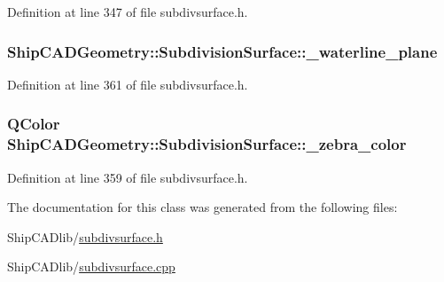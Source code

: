Definition at line 347 of file subdivsurface.\-h.

\hypertarget{classShipCADGeometry_1_1SubdivisionSurface_aaa7e9b322884649fb506848a9b4e2994}{
\subsubsection[{\-\_\-waterline\-\_\-plane}]{ Ship\-C\-A\-D\-Geometry\-::\-Subdivision\-Surface\-::\-\_\-waterline\-\_\-plane\hspace{0.3cm}{\ttfamily [protected]}}}\label{classShipCADGeometry_1_1SubdivisionSurface_aaa7e9b322884649fb506848a9b4e2994}


Definition at line 361 of file subdivsurface.\-h.

\hypertarget{classShipCADGeometry_1_1SubdivisionSurface_a26726d15987c2985f5ba16fba5c470b7}{
\subsubsection[{\-\_\-zebra\-\_\-color}]{\setlength{\rightskip}{0pt plus 5cm}Q\-Color Ship\-C\-A\-D\-Geometry\-::\-Subdivision\-Surface\-::\-\_\-zebra\-\_\-color\hspace{0.3cm}{\ttfamily [protected]}}}\label{classShipCADGeometry_1_1SubdivisionSurface_a26726d15987c2985f5ba16fba5c470b7}


Definition at line 359 of file subdivsurface.\-h.



The documentation for this class was generated from the following files\-:\begin{DoxyCompactItemize}
\item 
Ship\-C\-A\-Dlib/\hyperlink{subdivsurface_8h}{subdivsurface.\-h}\item 
Ship\-C\-A\-Dlib/\hyperlink{subdivsurface_8cpp}{subdivsurface.\-cpp}\end{DoxyCompactItemize}
